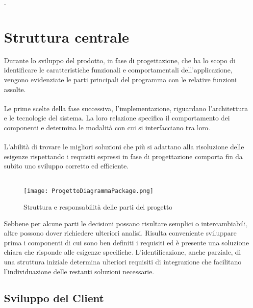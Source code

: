 -\section{Struttura centrale}

Durante lo sviluppo del prodotto, in fase di progettazione, che ha lo scopo di identificare le caratteristiche funzionali e comportamentali dell’applicazione, vengono evidenziate le parti principali del programma con le relative funzioni assolte.\\
\\
Le prime scelte della fase successiva, l’implementazione, riguardano l’architettura e le tecnologie del sistema. La loro relazione specifica il comportamento dei componenti e determina le modalità con cui si interfacciano tra loro.\\
\\
L’abilità di trovare le migliori soluzioni che più si adattano alla risoluzione delle esigenze rispettando i requisiti espressi in fase di progettazione comporta fin da subito uno sviluppo corretto ed efficiente.  \\
\\

\begin{figure}[h!]
    \centering
    \texttt{[image: ProgettoDiagrammaPackage.png]}
    \caption{Struttura e responsabilità delle parti del progetto}
\end{figure}
Sebbene per alcune parti le decisioni possano risultare semplici o intercambiabili, altre possono dover richiedere ulteriori analisi. Risulta conveniente sviluppare prima i componenti di cui sono ben definiti i requisiti ed è presente una soluzione chiara che risponde alle esigenze specifiche. L’identificazione, anche parziale, di una struttura iniziale determina ulteriori requisiti di integrazione che facilitano l’individuazione delle restanti soluzioni necessarie.

\clearpage
\subsection{Sviluppo del Client}

